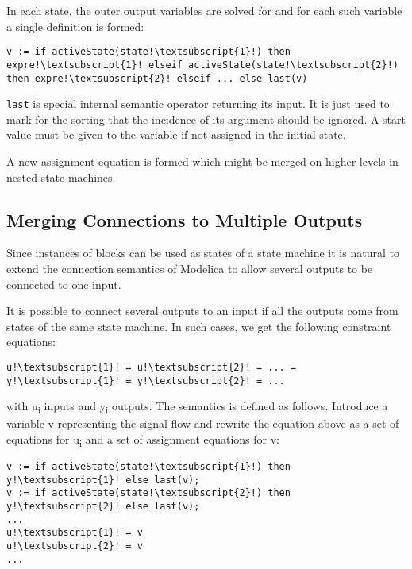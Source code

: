 In each state, the outer output variables are solved for and for each
such variable a single definition is formed:
\begin{lstlisting}[language=modelica,escapechar=!]
v := if activeState(state!\textsubscript{1}!) then expre!\textsubscript{1}! elseif activeState(state!\textsubscript{2}!) then expre!\textsubscript{2}! elseif ... else last(v)
\end{lstlisting}

\lstinline!last! is special internal semantic operator returning its
input. It is just used to mark for the sorting that the incidence of its
argument should be ignored. A start value must be given to the variable
if not assigned in the initial state.

A new assignment equation is formed which might be merged on higher
levels in nested state machines.

\subsection{Merging Connections to Multiple Outputs}\label{merging-connections-to-multiple-outputs}

\begin{nonnormative}
Since instances of blocks can be used as states of a state
machine it is natural to extend the connection semantics of Modelica to
allow several outputs to be connected to one input.
\end{nonnormative}

It is possible to connect several outputs to an input if all the outputs
come from states of the same state machine. In such cases, we get the
following constraint equations:
\begin{lstlisting}[language=modelica,escapechar=!]
u!\textsubscript{1}! = u!\textsubscript{2}! = ... = y!\textsubscript{1}! = y!\textsubscript{2}! = ...
\end{lstlisting}
with u\textsubscript{i} inputs and y\textsubscript{i} outputs. The
semantics is defined as follows. Introduce a variable v representing the
signal flow and rewrite the equation above as a set of equations for
u\textsubscript{i} and a set of assignment equations for v:
\begin{lstlisting}[language=modelica,escapechar=!]
v := if activeState(state!\textsubscript{1}!) then y!\textsubscript{1}! else last(v);
v := if activeState(state!\textsubscript{2}!) then y!\textsubscript{2}! else last(v);
...
u!\textsubscript{1}! = v
u!\textsubscript{2}! = v
...
\end{lstlisting}

